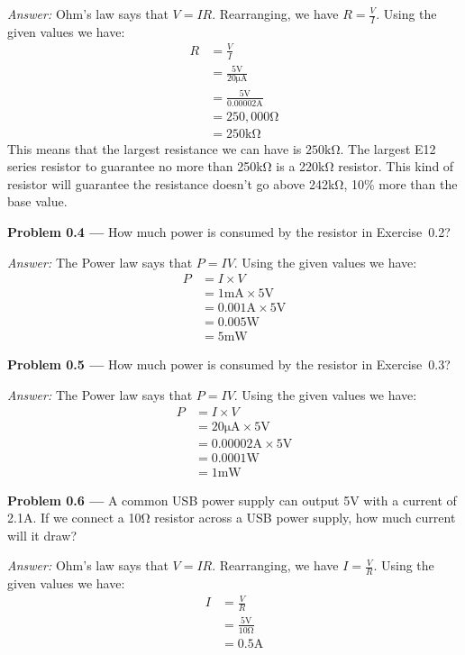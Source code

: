 \documentclass[11pt]{article}
\newcommand{\problem}[1]{\textbf{Problem #1 ---} }
\newcommand{\answer}{\textit{Answer: } }
\begin{document}
\answer Ohm's law says that $V = IR$. Rearranging, we have $R = \frac{V}{I}$.
Using the given values we have:
\begin{align*}
R &= \frac{V}{I}\\
  &= \frac{5\si{\volt}}{20\si{\micro\ampere}}\\
  &= \frac{5\si{\volt}}{0.00002\si{\ampere}}\\
  &= 250,000\si{\ohm}\\
  &= 250\si{\kilo\ohm}
\end{align*}
This means that the largest resistance we can have is $250\si{\kilo\ohm}$.
The largest E12 series resistor to guarantee no more than 250\si{\kilo\ohm} is a 220\si{\kilo\ohm} resistor.
This kind of resistor will guarantee the resistance doesn't go above 242\si{\kilo\ohm}, 10\% more than the base value.

\problem{0.4} How much power is consumed by the resistor in
Exercise~0.2?

\answer The Power law says that $P = IV$.
Using the given values we have:
\begin{align*}
P &= I\times V\\
  &= 1\si{\milli\ampere}\times 5\si{\volt}\\
  &= 0.001\si{\ampere}\times 5\si{\volt}\\
  &= 0.005\si{\watt}\\
  &= 5\si{\milli\watt}
\end{align*}

\problem{0.5} How much power is consumed by the resistor in
Exercise~0.3?

\answer The Power law says that $P = IV$.
Using the given values we have:
\begin{align*}
P &= I\times V\\
  &= 20\si{\micro\ampere}\times 5\si{\volt}\\
  &= 0.00002\si{\ampere}\times 5\si{\volt}\\
  &= 0.0001\si{\watt}\\
  &= 1\si{\milli\watt}
\end{align*}

\problem{0.6} A common USB power supply can output 5\si{\volt} with a
current of 2.1\si{\ampere}.  If we connect a 10\si{\ohm} resistor
across a USB power supply, how much current will it
draw?

\answer Ohm's law says that $V = IR$. Rearranging, we have $I = \frac{V}{R}$.
Using the given values we have:
\begin{align*}
I &= \frac{V}{R}\\\
  &= \frac{5\si{\volt}}{10\si{\ohm}}\\
  &= 0.5\si{\ampere}
\end{align*}
\end{document}
